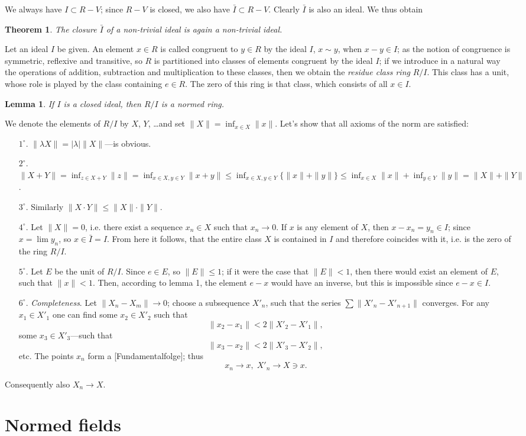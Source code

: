 \documentclass{article}
\newtheorem{theorem}{Theorem}
\newtheorem{lemma}{Lemma}
\theoremstyle{definition}
\begin{document}
We always have $I\subset R-V$; since $R-V$ is closed, we also have $\bar{I}\subset R-V$. Clearly $\bar{I}$ is also an ideal. We thus obtain
\begin{theorem}
  The closure $\bar{I}$ of a non-trivial ideal is again a non-trivial ideal.
\end{theorem}

Let an ideal $I$ be given. An element $x\in R$ is called congruent to $y\in R$ by the ideal $I$, $x\sim y$, when $x-y\in I$; as the notion of congruence is symmetric, reflexive and transitive, so $R$ is partitioned into classes of elements congruent by the ideal $I$; if we introduce in a natural way the operations of addition, subtraction and multiplication to these classes, then we obtain the \emph{residue class ring} $R/I$. This class has a unit, whose role is played by the class containing $e\in R$. The zero of this ring is that class, which consists of all $x\in I$.

\begin{lemma}
  If $I$ is a closed ideal, then $R/I$ is a normed ring.
\end{lemma}

We denote the elements of $R/I$ by $X$, $Y$, \dots and set $\|X\| = \inf_{x\in X} \|x\|$. Let's show that all axioms of the norm are satisfied:
\begin{enumerate}
\item [$1^\circ$.] $\|\lambda X\| = |\lambda| \|X\|$---is obvious.
\item [$2^\circ$.] $\|X+Y\| = \inf_{z\in X+Y} \|z\| = \inf_{x\in X, y\in Y} \|x + y\| \leq \inf_{x\in X, y\in Y} \{\|x\| + \|y\|\} \leq \inf_{x\in X} \|x\| + \inf_{y\in Y} \|y\| = \|X\| + \|Y\|$.
\item [$3^\circ$.] Similarly $\|X\cdot Y\| \leq \|X\|\cdot\|Y\|$.
\item [$4^\circ$.] Let $\|X\| = 0$, i.e. there exist a sequence $x_n\in X$ such that $x_n \to 0$. If $x$ is any element of $X$, then $x-x_n=y_n\in I$; since $x=\lim y_n$, so $x\in \bar{I}=I$. From here it follows, that the entire class $X$ is contained in $I$ and therefore coincides with it, i.e. is the zero of the ring $R/I$.
\item [$5^\circ$.] Let $E$ be the unit of $R/I$. Since $e\in E$, so $\|E\|\leq 1$; if it were the case that $\|E\|<1$, then there would exist an element of $E$, such that $\|x\|<1$. Then, according to lemma 1, the element $e-x$ would have an inverse, but this is impossible since $e-x\in I$.
\item [$6^\circ$.] \emph{Completeness}. Let $\|X_n-X_m\| \to 0$; choose a subsequence $X'_n$, such that the series $\sum\|X'_n-X'_{n+1}\|$ converges. For any $x_1\in X'_1$ one can find some $x_2\in X'_2$ such that
  $$ \|x_2-x_1\| < 2\|X'_2-X'_1\|, $$
  some $x_3\in X'_3$---such that
  $$ \|x_3-x_2\| < 2\|X'_3-X'_2\|, $$
  etc. The points $x_n$ form a [Fundamentalfolge]; thus
  $$ x_n \to x,\; X'_n\to X\ni x. $$
\end{enumerate}
Consequently also $X_n \to X$.

\section{Normed fields}
\end{document}
